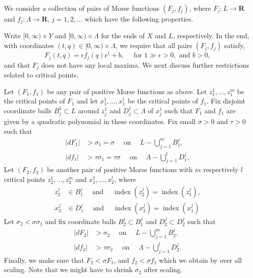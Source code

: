\documentclass{gtpart}
\renewcommand{\R}{\mathbf{R}}
\newcommand{\ind}{\operatorname{index}}
\begin{document}
We consider a collection of pairs of Morse functions $(F_j,f_j)$, where $F_j\colon L\to\R$ and
$f_{j}\colon\Lambda\to\R$, $j=1,2,\dots$ which have the following properties.  

Write $[0,\infty)\times Y$ and $[0,\infty)\times\Lambda$ for the ends of $X$ and $L$, respectively.
In the end, with coordinates $(t,q)\in [0,\infty)\times \Lambda$, we require that all pairs
$(F_{j},f_j)$ satisfy, 
\[ 
F_j(t,q)=\epsilon f_{j}(q) e^{t}+b,\quad \text{ for }1\gg \epsilon > 0, \text{ and }b>0, 
\] 
and that $F_j$ does not have any local maxima. We next discuss further restrictions related to critical points. 

Let $(F_1,f_1)$ be any pair of positive Morse functions as above. Let $z_1^{1},\dots, z_{1}^{m}$ be
the critical points of $F_1$ and let $x_1^{1},\dots,x_{1}^{l}$ be the critical points of $f_1$. Fix
disjoint coordinate balls $B_j^{1}\subset L$ around $z_j^{1}$ and $D_j^{1}\subset\Lambda$ of
$x^{1}_{j}$ such that $F_1$ and $f_1$ are given by a quadratic polynomial in these coordinates. Fix small $\sigma>0$ and $\tau> 0$ such that 
\begin{align*} 
|dF_1|&>\sigma_1=\sigma \quad\text{ on }\quad L-\bigcup_{j=1}^{m}B^{j}_{1},\\
|df_1|&>\tau\sigma_1=\tau\sigma \quad\text{ on }\quad \Lambda-\bigcup_{j=1}^{l}D^{j}_{1},
\end{align*}
Let $(F_2,f_2)$ be another pair of positive Morse functions with $m$ respectively $l$ critical points $z_{2}^{1},\dots, z_{2}^{m}$ and $x_{1}^{1},\dots, x_{2}^{l}$, where 
\begin{align*}
z_{2}^{j}&\in B_{1}^{j}\quad\text{ and }\quad \ind(z_{2}^{j})=\ind(z_{1}^{j}),\\
x_{2}^{j}&\in D_{1}^{j}\quad\text{ and }\quad \ind(x_{2}^{j})=\ind(x_{1}^{j})
\end{align*}
Let $\sigma_{2}<\sigma\sigma_{1}$ and fix coordinate balls $B^{j}_{2}\subset B_{1}^{j}$ and $D^{j}_{2}\subset D^{j}_{2}$  such that 
\begin{align*} 
|dF_2|&>\sigma_{2}\quad\text{ on }\quad L-\bigcup_{j=1}^{m}B^{j}_{2},\\
|df_2|&>\tau\sigma_{2}\quad\text{ on }\quad \Lambda-\bigcup_{j=1}^{l}D^{j}_{2}.
\end{align*} 
Finally, we make sure that $F_2<\sigma F_1$, and $f_{2}< \sigma f_{1}$ which we obtain by over all scaling. Note that we might have to shrink $\sigma_2$ after scaling.
\end{document}
